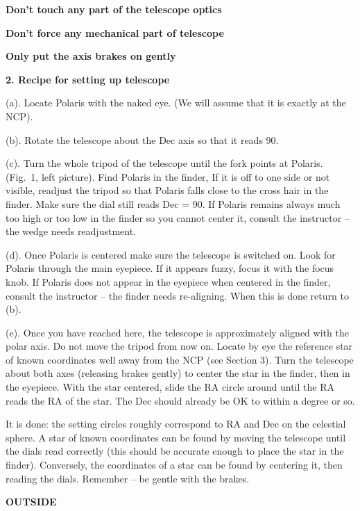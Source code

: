 \documentclass[12pt]{article}
\begin{document}
\bigskip
\centerline{\bf Don't touch any part of the telescope optics} 


\medskip
\centerline{\bf Don't force any mechanical part of telescope} 

\medskip
\centerline{\bf Only put the axis brakes on gently}

\medskip
\medskip
\bigskip
\noindent
{\bf 2. Recipe for setting up telescope}

\medskip\noindent
(a). Locate Polaris with the naked eye. (We will assume that it is
exactly at the NCP).

\medskip\noindent
(b). Rotate the telescope about the Dec axis so that it reads 90\deg.

\medskip\noindent
(c). Turn the whole tripod of the telescope until the fork points at
Polaris. (Fig.~1, left picture). Find Polaris in the finder, If it is
off to one side or not visible,
readjust the tripod so that Polaris falls close to the cross hair in
the finder. Make sure the dial still reads Dec = 90\deg. If Polaris
remains always much too high or too low in the finder so you cannot
center it, consult the instructor -- the wedge needs readjustment.

\medskip\noindent
(d). Once Polaris is centered make sure the telescope is switched
on. Look for Polaris through the main eyepiece. If it appears fuzzy,
focus it with the focus knob. If Polaris does not appear in the
eyepiece when centered in the finder, consult the instructor -- the
finder needs re-aligning. When this is done return to (b).

\medskip\noindent
(e). Once you have reached here, the telescope is approximately
aligned with the polar axis. Do not move the tripod from now on. Locate by
eye the reference star of known coordinates well away from the NCP
(see Section 3). Turn the telescope about both axes (releasing brakes
gently) to center the star in the finder, then in the eyepiece.
With the star centered, slide the RA circle around until the RA reads
the RA of the star. The Dec should already be OK to within a degree or
so.

\medskip\noindent
It is done: the setting circles roughly correspond to RA and
Dec on the celestial sphere. A star of known coordinates can be found
by moving the telescope until the dials read correctly (this should
be accurate enough to place the star in the finder). Conversely, the
coordinates of a star can be found by centering it, then reading the
dials. Remember -- be gentle with the brakes.


\newpage\noindent
{\bf OUTSIDE}
\end{document}
